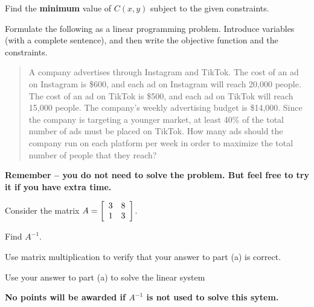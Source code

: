 \documentclass[11pt]{exam}
\begin{document}
\begin{questions}
\begin{compactenum}[(a)]
\item Find the \textbf{minimum} value of $C(x,y)$ subject to the given constraints.
\end{compactenum}
\newpage

\question[5] Formulate the following as a linear programming problem. Introduce variables (with a complete sentence), and then write the objective function and the constraints.

\begin{quote}
A company advertises through Instagram and TikTok.  The cost of an ad on Instagram is \$600, and each ad on Instagram will reach 20,000 people.  The cost of an ad on TikTok is \$500, and each ad on TikTok will reach 15,000 people.
The company's weekly advertising budget is \$14,000. Since the company is targeting a younger market, at least 40\% of the total number of ads must be placed on TikTok.  How many ads should the company run on each platform per week in order to maximize the total number of people that they reach?
\end{quote}

\textbf{Remember -- you do not need to solve the problem.  But feel free to try it if you have extra time.}
\newpage

\question[6] Consider the matrix $A=\MATRIX{rr}{3 & 8\\1 & 3}$.
\begin{compactenum}[(a)]
\item Find $A^{-1}$.
\vspace{6cm}

\item Use matrix multiplication to verify that your answer to part (a) is correct.
\vspace{4cm}

\item Use your answer to part (a) to solve the linear system
\begin{center}
\end{center}

\textbf{No points will be awarded if $A^{-1}$ is not used to solve this sytem.}
\end{compactenum}

\end{questions}
\end{document}
